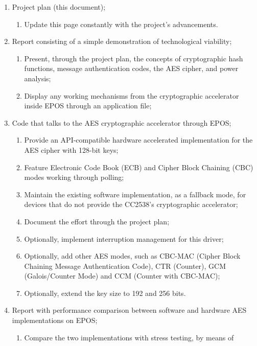 \documentclass{../sftex/sftex}
\begin{document}
\begin{enumerate}
  \item Project plan (this document);
  \begin{enumerate}
    \item Update this page constantly with the project's advancements.
  \end{enumerate}
  \item Report consisting of a simple demonstration of technological viability;
  \begin{enumerate}
    \item Present, through the project plan, the concepts of cryptographic hash
        functions, message authentication codes, the AES cipher, and power
          analysis;
    \item Display any working mechanisms from the cryptographic accelerator
        inside EPOS through an application file;
  \end{enumerate}
  \item Code that talks to the AES cryptographic accelerator through EPOS\@;
  \begin{enumerate}
    \item Provide an API-compatible hardware accelerated implementation for the
        AES cipher with 128-bit keys;
    \item Feature Electronic Code Book (ECB) and Cipher Block Chaining (CBC)
        modes working through polling;
    \item Maintain the existing software implementation, as a fallback mode,
        for devices that do not provide the CC2538's cryptographic accelerator;
    \item Document the effort through the project plan;
    \item Optionally, implement interruption management for this driver;
    \item Optionally, add other AES modes, such as CBC-MAC (Cipher Block
        Chaining Message Authentication Code), CTR (Counter), GCM
          (Galois/Counter Mode) and CCM (Counter with CBC-MAC);
    \item Optionally, extend the key size to 192 and 256 bits.
  \end{enumerate}
  \item Report with performance comparison between software and hardware AES
    implementations on EPOS\@;
  \begin{enumerate}
    \item Compare the two implementations with stress testing, by means of

\end{enumerate}
\end{enumerate}
\end{document}
